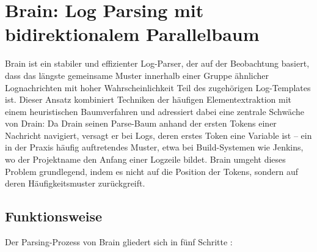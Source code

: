 \section{Brain: Log Parsing mit bidirektionalem Parallelbaum}
\label{sec:brain}

Brain \cite{brain} ist ein stabiler und effizienter Log-Parser, der auf der 
Beobachtung basiert, dass das längste gemeinsame Muster innerhalb einer Gruppe 
ähnlicher Lognachrichten mit hoher Wahrscheinlichkeit Teil des zugehörigen 
Log-Templates ist. Dieser Ansatz kombiniert Techniken der häufigen 
Elementextraktion mit einem heuristischen Baumverfahren und adressiert dabei 
eine zentrale Schwäche von Drain: Da Drain seinen Parse-Baum anhand der ersten 
Tokens einer Nachricht navigiert, versagt er bei Logs, deren erstes Token eine 
Variable ist – ein in der Praxis häufig auftretendes Muster, etwa bei 
Build-Systemen wie Jenkins, wo der Projektname den Anfang einer Logzeile bildet.\cite[C. Limitations of Existing Work]{brain}
Brain umgeht dieses Problem grundlegend, indem es nicht auf die Position der 
Tokens, sondern auf deren Häufigkeitsmuster zurückgreift.

\subsection{Funktionsweise}

Der Parsing-Prozess von Brain gliedert sich in fünf Schritte \cite[Abschn.~III]{brain}:

